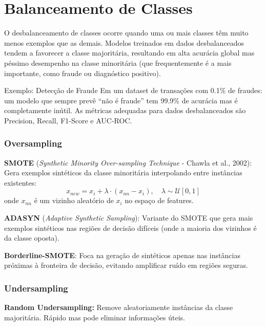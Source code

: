 \documentclass[12pt,a4paper]{article}
\begin{document}
\section{Balanceamento de Classes}

O desbalanceamento de classes ocorre quando uma ou mais classes têm muito menos exemplos que as demais. Modelos treinados em dados desbalanceados tendem a favorecer a classe majoritária, resultando em alta acurácia global mas péssimo desempenho na classe minoritária (que frequentemente é a mais importante, como fraude ou diagnóstico positivo).

\begin{exemplobox}{Exemplo: Detecção de Fraude}
Em um dataset de transações com 0.1\% de fraudes: um modelo que sempre prevê ``não é fraude'' tem 99.9\% de acurácia mas é completamente inútil. As métricas adequadas para dados desbalanceados são Precision, Recall, F1-Score e AUC-ROC.
\end{exemplobox}

\subsubsection{Oversampling}

\textbf{SMOTE} (\textit{Synthetic Minority Over-sampling Technique} - Chawla et al., 2002): Gera exemplos sintéticos da classe minoritária interpolando entre instâncias existentes:
\[
x_{new} = x_i + \lambda \cdot (x_{nn} - x_i), \quad \lambda \sim \mathcal{U}[0, 1]
\]
onde $x_{nn}$ é um vizinho aleatório de $x_i$ no espaço de features.

\textbf{ADASYN} (\textit{Adaptive Synthetic Sampling}): Variante do SMOTE que gera mais exemplos sintéticos nas regiões de decisão difíceis (onde a maioria dos vizinhos é da classe oposta).

\textbf{Borderline-SMOTE}: Foca na geração de sintéticos apenas nas instâncias próximas à fronteira de decisão, evitando amplificar ruído em regiões seguras.

\subsubsection{Undersampling}

\textbf{Random Undersampling:} Remove aleatoriamente instâncias da classe majoritária. Rápido mas pode eliminar informações úteis.
\end{document}
